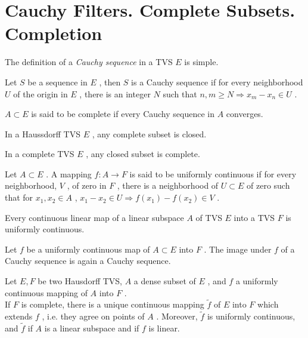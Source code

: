 \section{Cauchy Filters. Complete Subsets. Completion}

The definition of a \textit{Cauchy sequence} in a TVS $ E $ is simple.

\begin{defn}
	Let $ S $ be a sequence in $ E $ , then $ S $ is a Cauchy sequence if for every neighborhood $ U $  of the origin in $ E $ , there is an integer $ N $ such that $ n,m \geq N \Rightarrow x_{ m } - x_{ n } \in U $ .
\end{defn}

\begin{defn}
	$ A \subset E $ is said to be complete if every Cauchy sequence in $ A $ converges.
\end{defn}

\begin{prop}
	In a Haussdorff TVS $ E $ , any complete subset is closed.
\end{prop}

\begin{prop}
	In a complete TVS $ E $ , any closed subset is complete.
\end{prop}

\begin{defn}
	Let $ A \subset E $ . A mapping $ f: A \to F $ is said to be uniformly continuous if for every neighborhood, $ V $ , of zero in $ F $ , there is a neighborhood of $ U \subset E $ of zero such that for $ x_{ 1 }, x_{ 2 } \in A $ , $ x_{ 1 } - x_{ 2 } \in U \Rightarrow f(x_{ 1 }) - f(x_{ 2 }) \in V $ .
\end{defn}

\begin{prop}
	Every continuous linear map of a linear subspace $ A $ of TVS $ E $  into a TVS $ F $ is uniformly continuous.
\end{prop}

\begin{prop}
	Let $ f $ be a uniformly continuous map of $ A \subset E $ into $ F $ . The image under $ f $ of a Cauchy sequence is again a Cauchy sequence.
\end{prop}

\begin{thm}
	Let $ E,F $ be two Hausdorff TVS, $ A $ a dense subset of $ E $ , and $ f $ a uniformly continuous mapping of $ A $ into $ F $ . \\
	\indent If $ F $ is complete, there is a unique continuous mapping $ \tilde{ f } $ of $ E $ into $ F $ which extends $ f $ , i.e. they agree on points of $ A $ . Moreover, $ \tilde{ f } $ is uniformly continuous, and $ \tilde{ f } $ if $ A $ is a linear subspace and if $ f $ is linear.
\end{thm}

